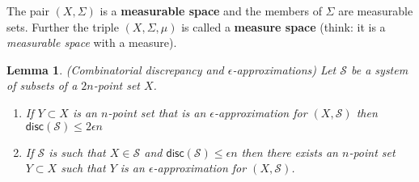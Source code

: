 \documentclass[twoside]{article}
\newtheorem{lemma}[theorem]{Lemma}
\newcommand\disc{\mathsf{disc}}
\newcommand\SSet{\mathcal{S}}
\begin{document}
The pair $(X, \Sigma)$ is a \textbf{measurable space} and the members of $\Sigma$ are measurable sets. Further the triple $(X, \Sigma, \mu)$ is called a \textbf{measure space} (think: it is a \emph{measurable space} with a measure).

\begin{lemma}
(Combinatorial discrepancy and $\epsilon$-approximations) Let $\SSet$ be a system  of subsets of a $2n$-point set $X$.
	\begin{enumerate}
	\item If $Y \subset X$ is an $n$-point set that is an $\epsilon$-approximation for $(X, \SSet)$ then $\disc(\SSet) \leq 2\epsilon n$
	\item If $\SSet$ is such that $X \in \SSet$ and $\disc(\SSet) \leq \epsilon n$ then there exists an $n$-point set $Y \subset X$ such that $Y$ is an $\epsilon$-approximation for $(X, \SSet)$.  
	\end{enumerate}
\end{lemma}
\end{document}

